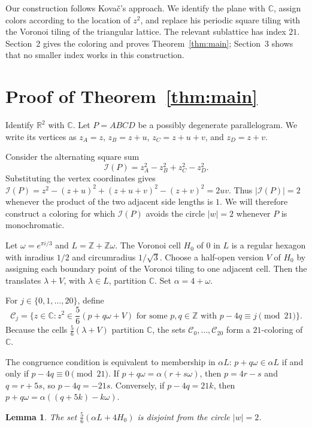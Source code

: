 \documentclass[12pt,reqno]{amsart}
\newtheorem{lemma}{Lemma}[section]
\theoremstyle{remark}
\theoremstyle{definition}
\numberwithin{equation}{section}
\begin{document}
Our construction follows Kova\v{c}'s approach. We identify the plane with $\mathbb C$, assign colors according to the location of $z^2$, and replace his periodic square tiling with the Voronoi tiling of the triangular lattice. The relevant sublattice has index $21$. Section~2 gives the coloring and proves Theorem~\ref{thm:main}; Section~3 shows that no smaller index works in this construction.

\section{Proof of Theorem~\ref{thm:main}}

Identify $\mathbb R^2$ with $\mathbb C$. Let $P=ABCD$ be a possibly degenerate parallelogram. We write its vertices as $z_A=z$, $z_B=z+u$, $z_C=z+u+v$, and $z_D=z+v$.


Consider the alternating square sum
\begin{equation}\label{eq:invariant}
\mathscr I(P)=z_A^2-z_B^2+z_C^2-z_D^2.
\end{equation}
Substituting the vertex coordinates gives $\mathscr I(P)=z^2-(z+u)^2+(z+u+v)^2-(z+v)^2=2uv$. Thus $|\mathscr I(P)|=2$ whenever the product of the two adjacent side lengths is $1$. We will therefore construct a coloring for which $\mathscr I(P)$ avoids the circle $|w|=2$ whenever $P$ is monochromatic.

Let $\omega=e^{\pi i/3}$ and $L=\mathbb Z+\mathbb Z\omega$. The Voronoi cell $H_0$ of $0$ in $L$ is a regular hexagon with inradius $1/2$ and circumradius $1/\sqrt3$. Choose a half-open version $V$ of $H_0$ by assigning each boundary point of the Voronoi tiling to one adjacent cell. Then the translates $\lambda+V$, with $\lambda\in L$, partition $\mathbb C$. Set $\alpha=4+\omega$.

For $j\in\{0,1,\ldots,20\}$, define
\[
\mathscr C_j=\bigl\{z\in\mathbb C:z^2\in \frac{5}{6}(p+q\omega+V)\text{ for some }p,q\in\mathbb Z\text{ with }p-4q\equiv j\pmod{21}\bigr\}.
\]
Because the cells $\frac{5}{6}(\lambda+V)$ partition $\mathbb C$, the sets $\mathscr C_0,\ldots,\mathscr C_{20}$ form a $21$-coloring of $\mathbb C$.

The congruence condition is equivalent to membership in $\alpha L$:
$p+q\omega\in\alpha L$ if and only if $p-4q\equiv0\pmod{21}$. If $p+q\omega=\alpha(r+s\omega)$, then $p=4r-s$ and $q=r+5s$, so $p-4q=-21s$. Conversely, if $p-4q=21k$, then $p+q\omega=\alpha((q+5k)-k\omega)$.

\begin{lemma}\label{lem:separation}
The set $\frac{5}{6}(\alpha L+4H_0)$ is disjoint from the circle $|w|=2$.
\end{lemma}
\end{document}
